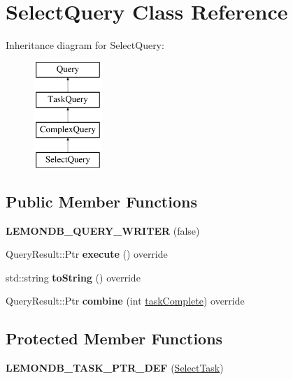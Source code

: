 \hypertarget{class_select_query}{}\section{Select\+Query Class Reference}
\label{class_select_query}
Inheritance diagram for Select\+Query\+:\begin{figure}[H]
\begin{center}
\leavevmode
\includegraphics[height=4.000000cm]{class_select_query}
\end{center}
\end{figure}
\subsection*{Public Member Functions}
\begin{DoxyCompactItemize}
\item 
\mbox{\label{class_select_query_ab9c596bfd41da9f9af66a514a49503ee}} 
{\bfseries L\+E\+M\+O\+N\+D\+B\+\_\+\+Q\+U\+E\+R\+Y\+\_\+\+W\+R\+I\+T\+ER} (false)
\item 
\mbox{\label{class_select_query_ac63dcfa4bcde09e85329790f9e774d96}} 
Query\+Result\+::\+Ptr {\bfseries execute} () override
\item 
\mbox{\label{class_select_query_a7e9bac231930b890df93125575520a7d}} 
std\+::string {\bfseries to\+String} () override
\item 
\mbox{\label{class_select_query_a54b33518896c0f005bfb164025943079}} 
Query\+Result\+::\+Ptr {\bfseries combine} (int \hyperlink{class_task_query_a3dc3e4c56ddea8ff025239fd9da358d3}{task\+Complete}) override
\end{DoxyCompactItemize}
\subsection*{Protected Member Functions}
\begin{DoxyCompactItemize}
\item 
\mbox{\label{class_select_query_abcfe881adeb4bef173aa9bee99a0e456}} 
{\bfseries L\+E\+M\+O\+N\+D\+B\+\_\+\+T\+A\+S\+K\+\_\+\+P\+T\+R\+\_\+\+D\+EF} (\hyperlink{class_select_task}{Select\+Task})
\end{DoxyCompactItemize}
